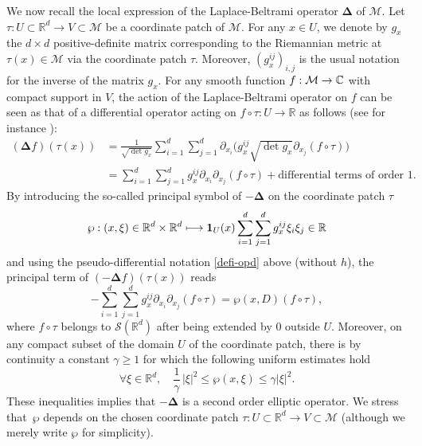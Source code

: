 \documentclass[11pt]{article}
\def\mto{\mathchoice{\longmapsto}{\mapsto}{\mapsto}{\mapsto}}
\theoremstyle{theorem}
\theoremstyle{definition}
\newcommand\Deltag{\mathbf{\Delta}}
\newcommand\R{\mathbb{R}}
\newcommand\pun{\mathbf{1}}
\begin{document}
We now recall the local expression of the Laplace-Beltrami operator $\Deltag$ of $\mathcal{M}$.
Let $\tau:U\subset \R^d \to V\subset \mathcal{M}$ be a coordinate patch of $\mathcal{M}$.
For any $x\in U$, we denote by $g_{x}$ the $d\times d$ positive-definite matrix corresponding to the Riemannian metric at $\tau(x)\in \mathcal{M}$ via the coordinate patch $\tau$.
Moreover, $(g_x^{ij})_{i,j}$ is the usual notation for the inverse of the matrix $g_x$.
For any smooth function $f:\mathcal{M}\to \mathbb{C}$ with compact support in $V$, the action of the Laplace-Beltrami operator on $f$ can be seen as that of a differential operator acting on $f\circ \tau:U\to \R$ as follows (see for instance \cite[p.\,167]{shub-pseudo}):
\begin{align*}
(\Deltag f)(\tau(x))& = \frac{1}{\sqrt{\det g_{x}}}\sum_{i=1}^d \sum_{j=1}^d \partial_{x_i} \Big(g_{x}^{ij} \sqrt{\det g_{x}} \partial_{x_j} (f\circ \tau) \Big) \\
& = \sum_{i=1}^d \sum_{j=1}^d g_x^{ij} \partial_{x_i} \partial_{x_j} (f\circ \tau) +\text{differential terms of order }1.
\end{align*}
By introducing the so-called principal symbol of $-\Deltag$ on the coordinate patch $\tau$
\begin{equation}\label{prin-sy}
\wp:(x,\xi)\in \R^d\times \R^d \mto \pun_{U}(x)\sum_{i=1}^d \sum_{j=1}^d g_x^{ij} \xi_i \xi_j\in\R
\end{equation}
and using the pseudo-differential notation \eqref{defi-opd} above (without $h$), the principal term of $(-\Deltag f)(\tau(x))$ reads
\begin{equation*}
-\sum_{i=1}^d \sum_{j=1}^d g_x^{ij}\partial_{x_i} \partial_{x_j} (f\circ \tau) =\wp(x,D)(f\circ\tau),
\end{equation*}
where $f\circ \tau$ belongs to $\mathcal{S}(\R^d)$ after being extended by $0$ outside $U$.
Moreover, on any compact subset of the domain $U$ of the coordinate patch, there is by continuity a constant $\gamma\geq 1$ for which the following uniform estimates hold
\begin{equation}\label{sym-p2}
\forall \xi\in \R^d,\quad \frac{1}{\gamma}\,|\xi|^2\leq \wp(x,\xi)\leq \gamma|\xi|^2.
\end{equation}
These inequalities implies that $-\Deltag$ is a second order elliptic operator.
We stress that~$\wp$ depends on the chosen coordinate patch $\tau:U\subset \R^d\to V\subset \mathcal{M}$ (although we merely write $\wp$ for simplicity).
\end{document}

